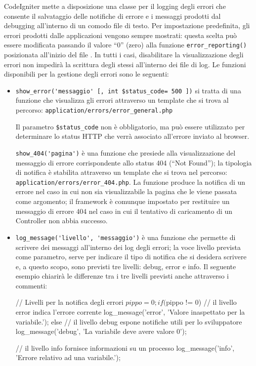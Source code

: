 CodeIgniter mette a disposizione una classe per il logging degli errori che consente il salvataggio delle notifiche di errore e i messaggi prodotti dal debugging all'interno di un comodo file di testo. Per impostazione predefinita, gli errori prodotti dalle applicazioni vengono sempre mostrati: questa scelta può essere modificata passando il valore ``0'' (zero) alla funzione \verb|error_reporting()| posizionata all'inizio del file . In tutti i casi, disabilitare la visualizzazione degli errori non impedirà la scrittura degli stessi all'interno dei file di log. Le funzioni disponibili per la gestione degli errori sono le seguenti:

\begin{itemize}
\item \verb|show_error('messaggio' [, int $status_code= 500 ])| si tratta di una funzione che visualizza gli errori attraverso un template che si trova al percorso: \verb|application/errors/error_general.php|

Il parametro \verb|$status_code| non è obbligatorio, ma può essere utilizzato per determinare lo status \ac{HTTP} che verrà associato all'errore inviato al browser.

\verb|show_404('pagina')| è una funzione che presiede alla visualizzazione del messaggio di errore corrispondente allo status 404 (``Not Found''); la tipologia di notifica è stabilita attraverso un template che si trova nel percorso: \verb|application/errors/error_404.php|. La funzione produce la notifica di un errore nel caso in cui non sia visualizzabile la pagina che le viene passata come argomento; il framework è comunque impostato per restituire un messaggio di errore 404 nel caso in cui il tentativo di caricamento di un Controller non abbia successo.

\item \verb|log_message('livello', 'messaggio')| è una funzione che permette di scrivere dei messaggi all'interno dei log degli errori; la voce livello prevista come parametro, serve per indicare il tipo di notifica che si desidera scrivere e, a questo scopo, sono previsti tre livelli: debug, error e info. Il seguente esempio chiarirà le differenze tra i tre livelli previsti anche attraverso i commenti:

\begin{code}
// Livelli per la notifica degli errori
$pippo = 0; 
if ($pippo != 0)
{
  // il livello error indica l'errore corrente
  log_message('error', 'Valore inaspettato per la variabile.');
}
else
{
  // il livello debug espone notifiche utili per lo sviluppatore 
  log_message('debug', 'La variabile deve avere valore 0');
}

// il livello info fornisce informazioni su un processo
log_message('info', 'Errore relativo ad una variabile.');
\end{code}

\end{itemize}

